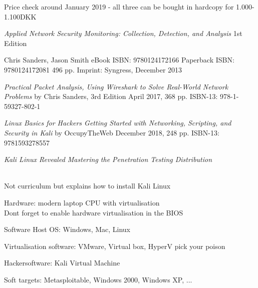 \documentclass[Screen16to9,17pt]{foils}
\begin{document}
Price check around January 2019 - all three can be bought in hardcopy for 1.000-1.100DKK



\emph{Applied Network Security Monitoring: Collection, Detection, and Analysis}
1st Edition

Chris Sanders, Jason Smith
eBook ISBN: 9780124172166
Paperback ISBN: 9780124172081 496 pp.
Imprint: Syngress, December 2013

{\footnotesize{}}


\emph{Practical Packet Analysis,
Using Wireshark to Solve Real-World Network Problems}
by Chris Sanders, 3rd Edition
April 2017, 368 pp.
ISBN-13:
978-1-59327-802-1




\emph{Linux Basics for Hackers
Getting Started with Networking, Scripting, and Security in Kali}
by OccupyTheWeb
December 2018, 248 pp.
ISBN-13:
9781593278557




\emph{Kali Linux Revealed  Mastering the Penetration Testing Distribution}

\\
Not curriculum but explains how to install Kali Linux







\begin{list2}
\item Hardware: modern laptop CPU with virtualisation\\
Dont forget to enable hardware virtualisation in the BIOS
\item Software Host OS: Windows, Mac, Linux
\item Virtualisation software: VMware, Virtual box, HyperV pick your poison
\item Hackersoftware: Kali Virtual Machine 
\item Soft targets: Metasploitable, Windows 2000, Windows XP, ...
\end{list2}
\end{document}
